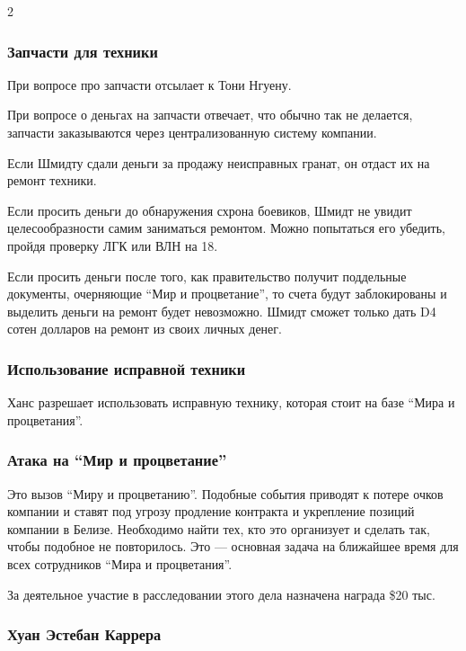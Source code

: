 \documentclass[twoside]{article}
\begin{document}
\begin{multicols}{2}
\subsubsection{Запчасти для техники}\label{vehicle-parts}

При вопросе про запчасти отсылает к Тони Нгуену.

При вопросе о деньгах на запчасти отвечает, что обычно так не делается,
запчасти заказываются через централизованную систему компании.

Если Шмидту сдали деньги за продажу неисправных гранат, он отдаст их на
ремонт техники.

Если просить деньги до обнаружения схрона боевиков, Шмидт не увидит
целесообразности самим заниматься ремонтом. Можно попытаться его
убедить, пройдя проверку ЛГК или ВЛН на 18.

Если просить деньги после того, как правительство получит поддельные
документы, очерняющие \enquote{Мир и процветание}, то счета будут заблокированы
и выделить деньги на ремонт будет невозможно. Шмидт сможет только дать
D4 сотен долларов на ремонт из своих личных денег.

\subsubsection{Использование исправной техники}\label{using-working-vehicles}

Ханс разрешает использовать исправную технику, которая стоит на базе
\enquote{Мира и процветания}.

\subsubsection{Атака на \enquote{Мир и процветание}}\label{pap-attack-schmidt}

Это вызов \enquote{Миру и процветанию}. Подобные события приводят к потере очков
компании и ставят под угрозу продление контракта и укрепление позиций
компании в Белизе. Необходимо найти тех, кто это организует и сделать
так, чтобы подобное не повторилось. Это --- основная задача на ближайшее
время для всех сотрудников \enquote{Мира и процветания}.

За деятельное участие в расследовании этого дела назначена награда \$20
тыс.

\subsubsection{Хуан Эстебан Каррера}\label{carrera-info}


\end{multicols}
\end{document}
